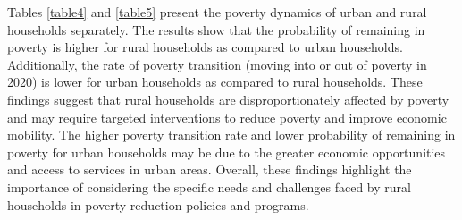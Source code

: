 \documentclass[12pt,a4paper]{article}
\begin{document}

Tables \autoref{table4} and \autoref{table5} present the poverty dynamics of urban and rural households separately. The results show that the probability of remaining in poverty is higher for rural households as compared to urban households. Additionally, the rate of poverty transition (moving into or out of poverty in 2020) is lower for urban households as compared to rural households. These findings suggest that rural households are disproportionately affected by poverty and may require targeted interventions to reduce poverty and improve economic mobility. The higher poverty transition rate and lower probability of remaining in poverty for urban households may be due to the greater economic opportunities and access to services in urban areas. Overall, these findings highlight the importance of considering the specific needs and challenges faced by rural households in poverty reduction policies and programs.
\end{document}
